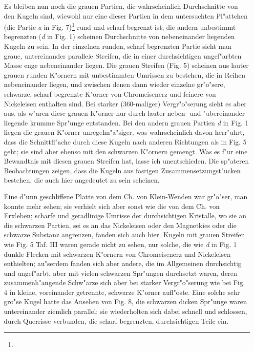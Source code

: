 \documentclass[a4paper, 11pt, oneside]{article}
\begin{document}
Es bleiben nun noch die grauen Partien, die wahrscheinlich Durchschnitte von den Kugeln sind, wiewohl nur eine dieser Partien in dem untersuchten Pl"attchen (die Partie \emph{a} in Fig. 7)\footnote{} rund und scharf begrenzt ist; die andern unbestimmt begrenzten (\emph{d} in Fig. 1) scheinen Durchschnitte von nebeneinander liegenden Kugeln zu sein. In der einzelnen runden, scharf begrenzten Partie sieht man graue, untereinander parallele Streifen, die in einer durchsichtigen ungef"arbten Masse enge nebeneinander liegen. Die grauen Streifen (Fig. 5) scheinen aus lauter grauen runden K"ornern mit unbestimmten Umrissen zu bestehen, die in Reihen nebeneinander liegen, und zwischen denen dann wieder einzelne gr"o"sere, schwarze, scharf begrenzte K"orner von Chromeisenerz und feinere von Nickeleisen enthalten sind. Bei starker (360-maliger) Vergr"o"serung sieht es aber aus, als w"aren diese grauen K"orner nur durch lauter neben- und "ubereinander liegende krumme Spr"unge entstanden. Bei den andern grauen Partien \emph{d} in Fig. 1 liegen die grauen K"orner unregelm"a"siger, was wahrscheinlich davon herr"uhrt, dass die Schnittfl"ache durch diese Kugeln nach anderen Richtungen als in Fig. 5 geht; sie sind aber ebenso mit den schwarzen K"ornern gemengt. Was es f"ur eine Bewandtnis mit diesen grauen Streifen hat, lasse ich unentschieden. Die sp"ateren Beobachtungen zeigen, dass die Kugeln aus fasrigen Zusammensetzungst"ucken bestehen, die auch hier angedeutet zu sein scheinen.

Eine d"unn geschliffene Platte von dem Ch. von Klein-Wenden war gr"o"ser, man konnte mehr sehen; sie verhielt sich aber sonst wie die von dem Ch. von Erxleben; scharfe und geradlinige Umrisse der durchsichtigen Kristalle, wo sie an die schwarzen Partien, sei es an das Nickeleisen oder den Magnetkies oder die schwarze Substanz angrenzen, fanden sich auch hier. Kugeln mit grauen Streifen wie Fig. 5 Taf. III waren gerade nicht zu sehen, nur solche, die wie \emph{d} in Fig. 1 dunkle Flecken mit schwarzen K"ornern von Chromeisenerz und Nickeleisen enthielten; au"serdem fanden sich aber andere, die im Allgemeinen durchsichtig und ungef"arbt, aber mit vielen schwarzen Spr"ungen durchsetzt waren, deren zusammenh"angende Schw"arze sich aber bei starker Vergr"o"serung wie bei Fig. 4 in kleine, voreinander getrennte, schwarze K"orner aufl"oste. Eine solche sehr gro"se Kugel hatte das Ansehen von Fig. 8, die schwarzen dicken Spr"unge waren untereinander ziemlich parallel; sie wiederholten sich dabei schnell und schlossen, durch Querrisse verbunden, die scharf begrenzten, durchsichtigen Teile ein.
\end{document}
